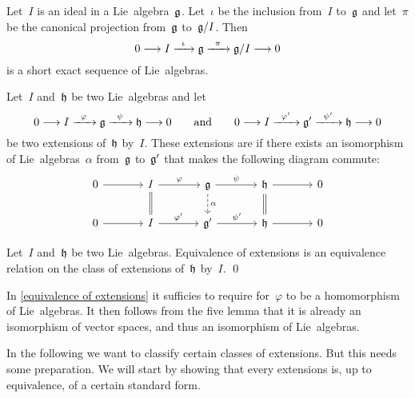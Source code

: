 \begin{example}
  Let~$I$ is an ideal in a Lie~algebra~$\mathfrak{g}$.
  Let~$\iota$ be the inclusion from~$I$ to~$\mathfrak{g}$ and let~$\pi$ be the canonical projection from~$\mathfrak{g}$ to~$\mathfrak{g}/I$.
  Then
  \[
    0
    \to
    I
    \xto{\iota}
    \glie
    \xto{\pi}
    \glie/I
    \to
    0
  \]
  is a short exact sequence of Lie~algebras.
\end{example}


\begin{definition}
  \label{equivalence of extensions}
  Let~$I$ and~$\mathfrak{h}$ be two Lie~algebras and let
  \[
    0 
    \to
    I
    \xto{\varphi}
    \glie
    \xto{\psi}
    \hlie
    \to
    0
    \qquad\text{and}\qquad
    0 
    \to
    I
    \xto{\varphi'}
    \glie'
    \xto{\psi'}
    \hlie
    \to
    0
  \]
  be two extensions of~$\mathfrak{h}$ by~$I$.
  These extensions are  if there exists an isomorphism of Lie~algebras~$\alpha$ from~$\mathfrak{g}$ to~$\mathfrak{g}'$ that makes the following diagram commute:
  \[
    \begin{tikzcd}[column sep = large]
      0
      \arrow{r}
      &
      I
      \arrow{r}[above]{\varphi}
      \arrow[equal]{d}
      &
      \glie
      \arrow{r}[above]{\psi}
      \arrow[dashed]{d}[right]{\alpha}
      &
      \hlie
      \arrow{r}
      \arrow[equal]{d}
      &
      0
      \\
      0
      \arrow{r}
      &
      I
      \arrow{r}[above]{\varphi'}
      &
      \glie'
      \arrow{r}[above]{\psi'}
      &
      \hlie
      \arrow{r}
      &
      0
    \end{tikzcd}
  \]
\end{definition}


\begin{proposition}
  Let~$I$ and~$\mathfrak{h}$ be two Lie~algebras.
  Equivalence of extensions is an equivalence relation on the class of extensions of~$\mathfrak{h}$ by~$I$.
  \qed
\end{proposition}


\begin{remark}
  In \cref{equivalence of extensions} it sufficies to require for~$\varphi$ to be a homomorphism of Lie~algebras.
  It then follows from the five lemma that it is already an isomorphism of vector spaces, and thus an isomorphism of Lie~algebras.
\end{remark}


\begin{fluff}
  In the following we want to classify certain classes of extensions.
  But this needs some preparation.
  We will start by showing that every extensions is, up to equivalence, of a certain standard form.
\end{fluff}


